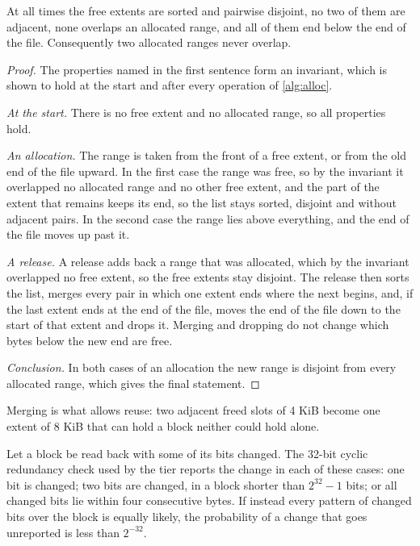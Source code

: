 \begin{proposition}
\label{prop:freelist}%
At all times the free extents are sorted and pairwise disjoint, no two of
them are adjacent, none overlaps an allocated range, and all of them end
below the end of the file. Consequently two allocated ranges never overlap.
\end{proposition}

\begin{proof}
The properties named in the first sentence form an invariant, which is
shown to hold at the start and after every operation of \cref{alg:alloc}.

\emph{At the start.} There is no free extent and no allocated range, so all
properties hold.

\emph{An allocation.} The range is taken from the front of a free extent, or
from the old end of the file upward. In the first case the range was free, so
by the invariant it overlapped no allocated range and no other free extent,
and the part of the extent that remains keeps its end, so the list stays
sorted, disjoint and without adjacent pairs. In the second case the range
lies above everything, and the end of the file moves up past it.

\emph{A release.} A release adds back a range that was allocated, which by
the invariant overlapped no free extent, so the free extents stay disjoint.
The release then sorts the list, merges every pair in which one extent ends
where the next begins, and, if the last extent ends at the end of the file,
moves the end of the file down to the start of that extent and drops it.
Merging and dropping do not change which bytes below the new end are free.

\emph{Conclusion.} In both cases of an allocation the new range is disjoint
from every allocated range, which gives the final statement.
\end{proof}

Merging is what allows reuse: two adjacent freed slots of 4 KiB become one
extent of 8 KiB that can hold a block neither could hold alone.

\begin{proposition}
\label{prop:crc}%
Let a block be read back with some of its bits changed. The 32-bit cyclic
redundancy check used by the tier reports the change in each of these cases:
one bit is changed; two bits are changed, in a block shorter than
$2^{32} - 1$ bits; or all changed bits lie within four consecutive bytes. If
instead every pattern of changed bits over the block is equally likely, the
probability of a change that goes unreported is less than $2^{-32}$.
\end{proposition}

